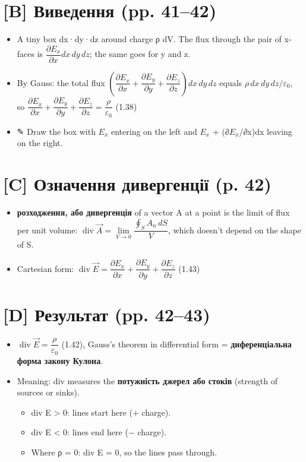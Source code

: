 \documentclass[11pt,a4paper,oneside]{book}
\newcommand{\pen}{{\sffamily\color{accent}✎}}
\begin{document}
\section*{[B] Виведення (pp. 41–42)}
\begin{itemize}
\item A tiny box dx·dy·dz around charge ρ dV. The flux through the pair of x-faces is $\dfrac{\partial E_x}{\partial x}dx\,dy\,dz$; the same goes for y and z.
\item By Gauss: the total flux $\left(\dfrac{\partial E_x}{\partial x}+\dfrac{\partial E_y}{\partial y}+\dfrac{\partial E_z}{\partial z}\right)dx\,dy\,dz$ equals $\rho\,dx\,dy\,dz/\varepsilon_0$, so $\dfrac{\partial E_x}{\partial x}+\dfrac{\partial E_y}{\partial y}+\dfrac{\partial E_z}{\partial z} = \dfrac{\rho}{\varepsilon_0}$ (1.38)
\item \pen{} Draw the box with $E_{x}$ entering on the left and $E_{x}$ + (∂$E_{x}$/∂x)dx leaving on the right.
\end{itemize}

\section*{[C] Означення дивергенції (p. 42)}
\begin{itemize}
\item \textbf{розходження, або дивергенція} of a vector A at a point is the limit of flux per unit volume:
$\operatorname{div}\vec A = \lim\limits_{V\to0}\dfrac{\oint_S A_n\,dS}{V}$, which doesn't depend on the shape of S.
\item Cartesian form: $\operatorname{div}\vec E = \dfrac{\partial E_x}{\partial x}+\dfrac{\partial E_y}{\partial y}+\dfrac{\partial E_z}{\partial z}$ (1.43)
\end{itemize}

\section*{[D] Результат (pp. 42–43)}
\begin{itemize}
\item $\operatorname{div}\vec E = \dfrac{\rho}{\varepsilon_0}$ (1.42), Gauss's theorem in differential form = \textbf{диференціальна форма закону Кулона}.
\item Meaning: div measures the \textbf{потужність джерел або стоків} (strength of sources or sinks).
\begin{itemize}
\item div E > 0: lines start here (+ charge).
\item div E < 0: lines end here (− charge).
\item Where ρ = 0: div E = 0, so the lines pass through.
\end{itemize}
\end{itemize}
\end{document}
